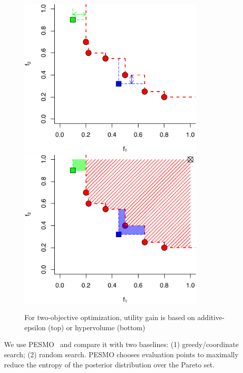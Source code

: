 \begin{figure}
  \centering
  \includegraphics[width=0.8\textwidth]{figures/serving-bo-2d-1.pdf} \\
  \includegraphics[width=0.8\textwidth]{figures/serving-bo-2d-2.pdf}
  \caption{For two-objective optimization, utility gain is based on
    additive-epsilon (top) or hypervolume (bottom)~\cite{binoisgpareto}}
\end{figure}

We use PESMO~\cite{hernandez2016predictive} and compare it with two baselines:
(1) greedy/coordinate search; (2) random search. PESMO chooses evaluation points
to maximally reduce the entropy of the posterior distribution over the Pareto
set.



